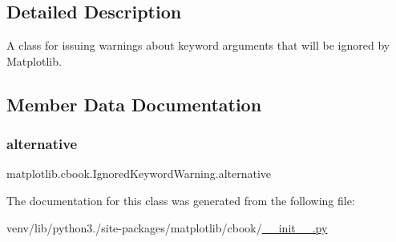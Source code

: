 \subsection{Detailed Description}
\begin{DoxyVerb}A class for issuing warnings about keyword arguments that will be ignored
by Matplotlib.
\end{DoxyVerb}
 

\subsection{Member Data Documentation}
\mbox{\label{classmatplotlib_1_1cbook_1_1IgnoredKeywordWarning_a519fd686c76b4f12af00217eb5876d3b}} 
\subsubsection{\texorpdfstring{alternative}{alternative}}
{\footnotesize\ttfamily matplotlib.\+cbook.\+Ignored\+Keyword\+Warning.\+alternative\hspace{0.3cm}{\ttfamily [static]}}



The documentation for this class was generated from the following file\+:\begin{DoxyCompactItemize}
\item 
venv/lib/python3./site-\/packages/matplotlib/cbook/\hyperlink{venv_2lib_2python3_89_2site-packages_2matplotlib_2cbook_2____init_____8py}{\+\_\+\+\_\+init\+\_\+\+\_\+.\+py}\end{DoxyCompactItemize}

